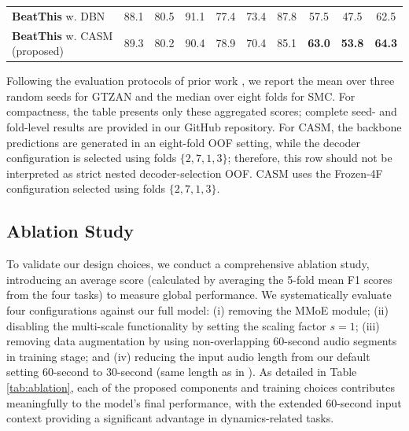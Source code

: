 \documentclass{article}
\begin{document}
\begin{table}[t]
{\begin{tabular}{l|ccc|ccc|ccc}
\rowcolor{gray!10}
\textbf{BeatThis} w. DBN
& 88.1 & 80.5 & 91.1
& 77.4 & 73.4 & 87.8
& 57.5 & 47.5 & 62.5 \\
\textbf{BeatThis} w. CASM (proposed)
& 89.3 & 80.2 & 90.4
& 78.9 & 70.4 & 85.1
& \textbf{63.0} & \textbf{53.8} & \textbf{64.3} \\
\bottomrule
\end{tabular}%
}
\vspace{2pt}
\begin{minipage}{0.99\columnwidth}
\footnotesize
Following the evaluation protocols of prior work
\cite{foscarin2024beat, ru2025hingenet, ru2025beatfm}, we report the mean over three random seeds for GTZAN and the median over eight folds for SMC. For compactness, the table presents only these aggregated scores; complete seed- and fold-level results are provided in our GitHub repository. For CASM, the backbone predictions are generated in an eight-fold OOF setting, while the decoder configuration is selected using folds $\{2,7,1,3\}$; therefore, this row should not be interpreted as strict nested decoder-selection OOF. CASM uses the Frozen-4F configuration selected using folds $\{2,7,1,3\}$.
\end{minipage}
\endgroup
\end{table}


\subsection{Ablation Study}
To validate our design choices, we conduct a comprehensive ablation study, introducing an average score (calculated by averaging the 5-fold mean F1 scores from the four tasks) to measure global performance. We systematically evaluate four configurations against our full model: (i) removing the MMoE module; (ii) disabling the multi-scale functionality by setting the scaling factor $s=1$; (iii) removing data augmentation by using non-overlapping 60-second audio segments in training stage; and (iv) reducing the input audio length from our default setting 60-second to 30-second (same length as in \cite{foscarin2024beat}). As detailed in Table \ref{tab:ablation}, each of the proposed components and training choices contributes meaningfully to the model's final performance, with the extended 60-second input context providing a significant advantage in dynamics-related tasks.
\end{document}
